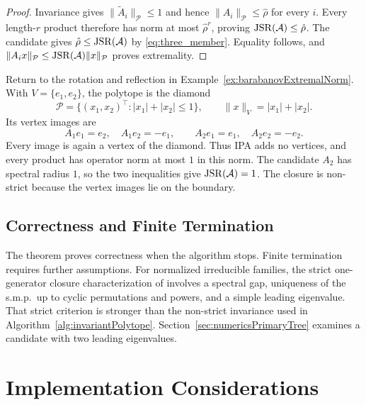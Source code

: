 \begin{proof}
    Invariance gives $\lVert\tilde{A}_i\rVert_{\mathcal{P}}\leq1$ and hence $\lVert A_i\rVert_{\mathcal{P}}\leq\hat\rho$ for every $i$.
    Every length-$r$ product therefore has norm at most $\hat\rho^r$, proving $\operatorname{JSR}(\mathcal{A})\leq\hat\rho$.
    The candidate gives $\hat\rho\leq\operatorname{JSR}(\mathcal{A})$ by \eqref{eq:three_member}.
    Equality follows, and $\lVert A_ix\rVert_{\mathcal{P}}\leq\operatorname{JSR}(\mathcal{A})\lVert x\rVert_{\mathcal{P}}$ proves extremality.
\end{proof}

\begin{example}
    \label{ex:ipaDiamondCertificate}
    Return to the rotation and reflection in Example~\ref{ex:barabanovExtremalNorm}.
    With $V=\{e_1,e_2\}$, the polytope is the diamond
    \[
        \mathcal{P}=\{(x_1,x_2)^\top:|x_1|+|x_2|\leq1\},\qquad
        \lVert x\rVert_V=|x_1|+|x_2|.
    \]
    Its vertex images are
    \[
        A_1e_1=e_2,\quad A_1e_2=-e_1,\qquad
        A_2e_1=e_1,\quad A_2e_2=-e_2.
    \]
    Every image is again a vertex of the diamond.
    Thus IPA adds no vertices, and every product has operator norm at most $1$ in this norm.
    The candidate $A_2$ has spectral radius $1$, so the two inequalities give $\operatorname{JSR}(\mathcal{A})=1$.
    The closure is non-strict because the vertex images lie on the boundary.
\end{example}

\subsection{Correctness and Finite Termination}

The theorem proves correctness when the algorithm stops.
Finite termination requires further assumptions.
For normalized irreducible families, the strict one-generator closure characterization of \citet[Theorem 2.5]{MejstrikReif2025HybridApproachJSR} involves a spectral gap, uniqueness of the s.m.p.\ up to cyclic permutations and powers, and a simple leading eigenvalue.
That strict criterion is stronger than the non-strict invariance used in Algorithm~\ref{alg:invariantPolytope}.
Section~\ref{sec:numericsPrimaryTree} examines a candidate with two leading eigenvalues.

\section{Implementation Considerations}

